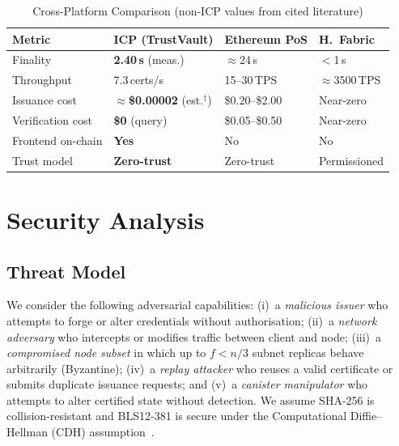 \documentclass[conference,a4paper]{IEEEtran}
\begin{document}
\begin{table}[t]
\caption{Cross-Platform Comparison (non-ICP values from cited literature)}
\label{tab:comparison}
\centering\small\renewcommand{\arraystretch}{1.2}
\setlength{\tabcolsep}{3pt}
\begin{tabular}{@{}llll@{}}
\toprule
\textbf{Metric} & \textbf{ICP (TrustVault)} & \textbf{Ethereum PoS} & \textbf{H.\ Fabric} \\
\midrule
Finality          & \textbf{2.40\,s} (meas.)  & $\approx$24\,s \cite{buterin2020eth2}  & $<$1\,s \cite{androulaki2018fabric} \\
Throughput        & 7.3\,certs/s              & 15--30\,TPS \cite{dinh2017blockbench}  & $\approx$3500\,TPS \cite{androulaki2018fabric} \\
Issuance cost     & $\approx$\textbf{\$0.00002} (est.$^\dagger$)  & \$0.20--\$2.00 \cite{wood2014ethereum} & Near-zero \\
Verification cost & \textbf{\$0} (query)      & \$0.05--\$0.50 \cite{wood2014ethereum} & Near-zero \\
Frontend on-chain & \textbf{Yes}              & No                                     & No \\
Trust model       & \textbf{Zero-trust}       & Zero-trust                             & Permissioned \\
\bottomrule
\end{tabular}
\end{table}

\section{Security Analysis}
\label{sec:security}

\subsection{Threat Model}

We consider the following adversarial capabilities: (i)~a \emph{malicious issuer} who attempts to forge or alter credentials without authorisation; (ii)~a \emph{network adversary} who intercepts or modifies traffic between client and node; (iii)~a \emph{compromised node subset} in which up to $f < n/3$ subnet replicas behave arbitrarily (Byzantine); (iv)~a \emph{replay attacker} who reuses a valid certificate or submits duplicate issuance requests; and (v)~a \emph{canister manipulator} who attempts to alter certified state without detection. We assume SHA-256 is collision-resistant and BLS12-381 is secure under the Computational Diffie--Hellman (CDH) assumption~\cite{boneh2001bls}.
\end{document}
